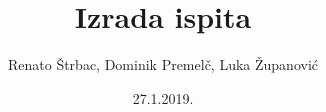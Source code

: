 \documentclass{beamer}
\title{Izrada ispita}
\date{27.1.2019.}
\author{Renato Štrbac, Dominik Premelč, Luka Županović}
\begin{document}
\maketitle
\tableofcontents


\begin{frame}

\end{frame}



\begin{frame}

\end{frame}
		

\begin{frame}

\end{frame}
	

	
\end{document}
